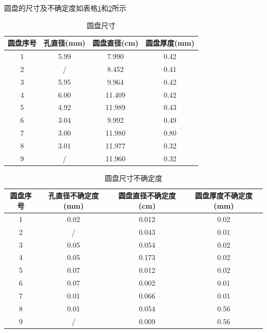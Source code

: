 \documentclass[UTF8]{gapd}
\begin{document}
圆盘的尺寸及不确定度如表格\ref{tab:unsinkable_disc_disc's_size}和\ref{tab:unsinkable_disc_disc's_uncertainty}所示
\begin{table}[htbp]
    \centering
    \begin{tabular}{cccc}
        \hline
         圆盘序号&孔直径(mm)&圆盘直径(cm)&圆盘厚度(mm)\\
        \hline
         1&5.99&7.990&0.42\\
         2&/&8.452&0.41\\
         3&5.95&9.964&0.42\\
         4&6.00&11.409&0.42\\
         5&4.92&11.989&0.43\\
         6&3.04&9.992&0.49\\
         7&3.00&11.980&0.80\\
         8&3.01&11.977&0.32\\
         9&/&11.960&0.32\\
         \hline
    \end{tabular}
    \caption{圆盘尺寸}
    \label{tab:unsinkable_disc_disc's_size}
\end{table}
\begin{table}[htbp]
    \centering
    \begin{tabular}{cccc}
        \hline
         圆盘序号&孔直径不确定度(mm)&圆盘直径不确定度(cm)&圆盘厚度不确定度(mm)\\
        \hline
         1&0.02&0.012&0.02\\
         2&/&0.043&0.01\\
         3&0.05&0.054&0.02\\
         4&0.05&0.173&0.02\\
         5&0.07&0.012&0.02\\
         6&0.07&0.002&0.01\\
         7&0.01&0.066&0.01\\
         8&0.01&0.054&0.56\\
         9&/&0.009&0.56\\
         \hline
    \end{tabular}
    \caption{圆盘尺寸不确定度}
    \label{tab:unsinkable_disc_disc's_uncertainty}
\end{table}
\end{document}
